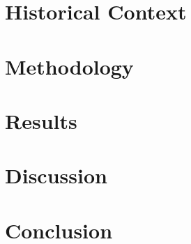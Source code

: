\documentclass[12pt]{article}
\begin{document}
\section{Historical Context}


\section{Methodology}


\section{Results}


\section{Discussion}




\section{Conclusion}




\end{document}
